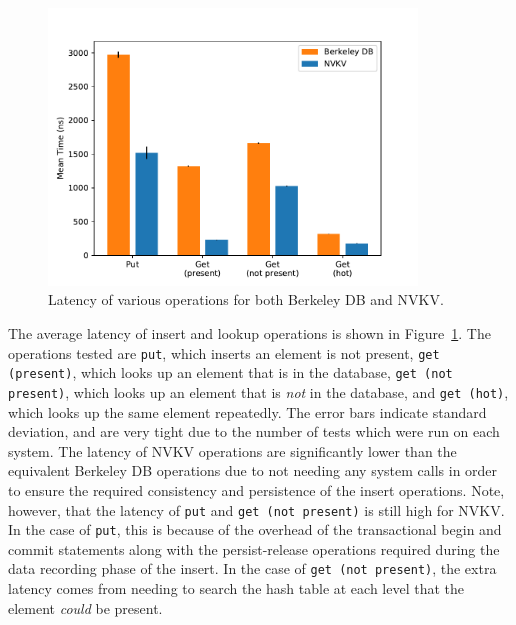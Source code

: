\begin{figure}
\centering
\hspace*{-0.5in}
\includegraphics[width=98mm]{fig/perf}
\caption{Latency of various operations for both Berkeley DB and NVKV.}
\label{fig:perf}
\end{figure}

The average latency of insert and lookup operations is shown in
Figure~\ref{fig:perf}. The operations tested are \texttt{put}, which inserts an
element is not present, \texttt{get (present)}, which
looks up an element that is in the database, \texttt{get (not present)}, which
looks up an element that is \textit{not} in the database, and \texttt{get
(hot)}, which looks up the same element repeatedly. The error bars indicate
standard deviation, and are very tight due to the number of tests which were run
on each system. The latency of NVKV operations are significantly lower than the
equivalent Berkeley DB operations due to not needing any system calls in order
to ensure the required consistency and persistence of the insert operations.
Note, however, that the latency of \texttt{put} and \texttt{get (not present)}
is still high for NVKV. In the case of \texttt{put}, this is because of the
overhead of the transactional begin and commit statements along with the
persist-release operations required during the data recording phase of the
insert. In the case of \texttt{get (not present)}, the extra latency comes from
needing to search the hash table at each level that the element \textit{could}
be present.







